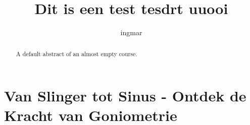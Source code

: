 \documentclass{xourse}
\title{Dit is een test tesdrt uuooi}
\author{ingmar}
\begin{document}
\begin{abstract}
    A default abstract of an almost empty course.
\end{abstract}

\maketitle


\part{Van Slinger tot Sinus - Ontdek de Kracht van Goniometrie}
\end{document}
